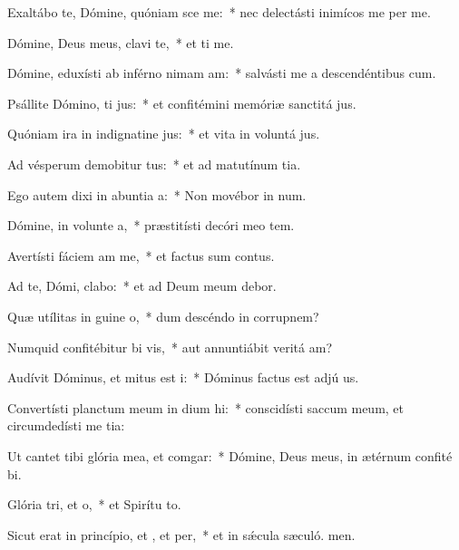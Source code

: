 \item Exaltábo te, Dómine, quóniam sce me:~* nec delectásti inimícos me per me.
\item Dómine, Deus meus, clavi  te,~* et ti me.
\item Dómine, eduxísti ab inférno nimam am:~* salvásti me a descendéntibus  cum.
\item Psállite Dómino, ti jus:~* et confitémini memóriæ sanctitá jus.
\item Quóniam ira in indignatine jus:~* et vita in voluntá jus.
\item Ad vésperum demobitur tus:~* et ad matutínum tia.
\item Ego autem dixi in abuntia a:~* Non movébor in num.
\item Dómine, in volunte a,~* præstitísti decóri meo tem.
\item Avertísti fáciem am  me,~* et factus sum contus.
\item Ad te, Dómi, clabo:~* et ad Deum meum debor.
\item Quæ utílitas in guine o,~* dum descéndo in corrupnem?
\item Numquid confitébitur bi vis,~* aut annuntiábit veritá am?
\item Audívit Dóminus, et mitus est i:~* Dóminus factus est adjú us.
\item Convertísti planctum meum in dium hi:~* conscidísti saccum meum, et circumdedísti me tia:
\item Ut cantet tibi glória mea, et  comgar:~* Dómine, Deus meus, in ætérnum confité bi.
\item Glória tri, et o,~* et Spirítu to.
\item Sicut erat in princípio, et , et per,~* et in sǽcula sæculó. men.
